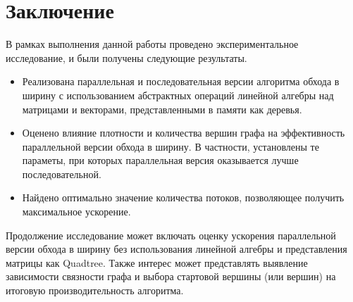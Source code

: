 
\section*{Заключение}
В рамках выполнения данной работы проведено экспериментальное исследование, и были получены следующие результаты.
\begin{itemize}
    \item Реализована параллельная и последовательная версии алгоритма обхода в ширину с использованием абстрактных операций линейной алгебры над матрицами и векторами, представленными в памяти как деревья.
    \item Оценено влияние плотности и количества вершин графа на эффективность параллельной версии обхода в ширину. В частности, установлены те параметы, при которых параллельная версия оказывается лучше последовательной.
    \item Найдено оптимально значение количества потоков, позволяющее получить максимальное ускорение.
\end{itemize}

Продолжение исследование может включать оценку ускорения параллельной версии обхода в ширину без использования линейной алгебры и представления матрицы как Quadtree.
Также интерес может представлять выявление зависимости связности графа и выбора стартовой вершины (или вершин) на итоговую производительность алгоритма.